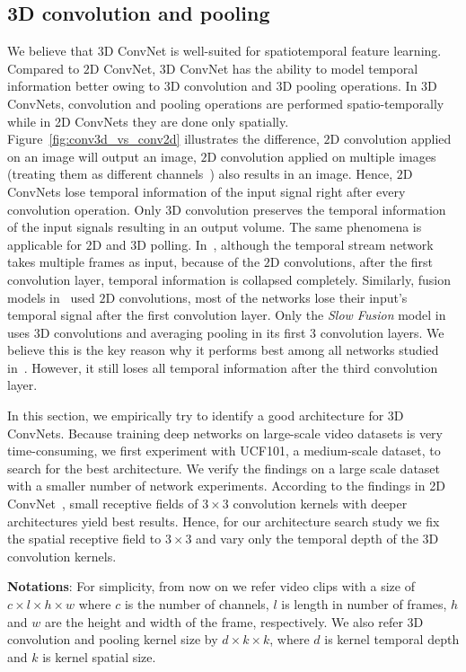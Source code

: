 \documentclass[10pt,twocolumn,letterpaper]{article}
\begin{document}
\subsection{3D convolution and pooling}
We believe that $3$D ConvNet is well-suited for spatiotemporal feature learning. Compared to $2$D ConvNet, $3$D ConvNet has the ability to model temporal information better owing to $3$D convolution and $3$D pooling operations. In $3$D ConvNets, convolution and pooling operations are performed spatio-temporally while in 2D ConvNets they are done only spatially. Figure~\ref{fig:conv3d_vs_conv2d} illustrates the difference, $2$D convolution applied on an image will output an image, $2$D convolution applied on multiple images (treating them as different channels~\cite{SimonyanZ14}) also results in an image. Hence, $2$D ConvNets lose temporal information of the input signal right after every convolution operation. Only $3$D convolution preserves the temporal information of the input signals resulting in an output volume. The same phenomena is applicable for $2$D and $3$D polling.  In~\cite{SimonyanZ14}, although the temporal stream network takes multiple frames as input, because of the $2$D convolutions, after the first convolution layer, temporal information is collapsed completely. Similarly, fusion models in~\cite{Karpathy14} used $2$D convolutions, most of the networks lose their input's temporal signal after the first convolution layer. Only the \emph{Slow Fusion} model in~\cite{Karpathy14} uses $3$D convolutions and averaging pooling in its first $3$ convolution layers. We believe this is the key reason why it performs best among all networks studied in~\cite{Karpathy14}. However, it still loses all temporal information after the third convolution layer.

In this section, we empirically try to identify a good architecture for 3D ConvNets. Because training deep networks on large-scale video datasets is very time-consuming, we first experiment with UCF101, a medium-scale dataset, to search for the best architecture. We verify the findings on a large scale dataset with a smaller number of network experiments. According to the findings in 2D ConvNet~\cite{SimonyanZ14a}, small receptive fields of $3 \times 3$ convolution kernels with deeper architectures yield best results. Hence, for our architecture search study we fix the spatial receptive field to $3 \times 3$ and vary only the temporal depth of the 3D convolution kernels.

{\bf Notations}: For simplicity, from now on we refer video clips with a size of $c \times l \times h \times w$ where $c$ is the number of channels, $l$ is length in number of frames, $h$ and $w$ are the height and width of the frame, respectively. We also refer 3D convolution and pooling kernel size by $d \times k \times k$, where $d$ is kernel temporal depth and $k$ is kernel spatial size. 
\end{document}
